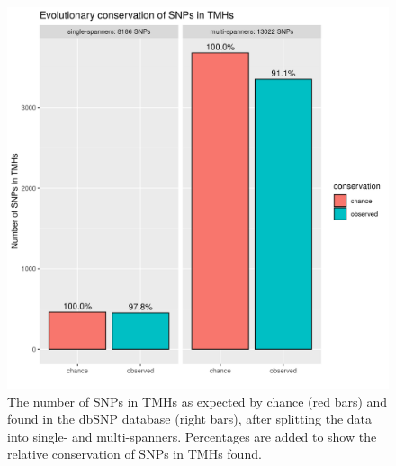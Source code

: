 \begin{figure}[!htbp]
  \includegraphics[width=\textwidth]{ncbi_peregrine_results/fig_conservation_per_spanner.png}
  \caption{
    The number of SNPs in TMHs as expected by chance (red bars) 
    and found in the dbSNP database (right bars), 
    after splitting the data into single- and multi-spanners.
    Percentages are added to show the relative conservation
    of SNPs in TMHs found.
  }
  \label{fig:conservation_per_spanner}
\end{figure}

